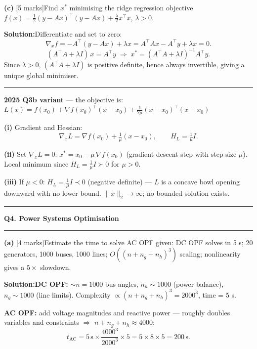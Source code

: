 \documentclass[10pt,a4paper]{article}
\newcommand{\sectitle}[1]{%
  \vspace{8pt}\noindent\rule{\linewidth}{0.8pt}\par\vspace{2pt}%
  {\large\textbf{#1}}\par\vspace{2pt}\rule{\linewidth}{0.4pt}\vspace{4pt}}
\newcommand{\Sol}{\par\vspace{4pt}\noindent\textbf{Solution:}\enspace}
\begin{document}
\vspace{4pt}
\noindent\textbf{(c)} [5 marks]\quad Find $x^*$ minimising the ridge regression
objective $f(x)=\tfrac{1}{2}(y-Ax)^\top(y-Ax)+\tfrac{\lambda}{2}x^\top x$,
$\lambda>0$.

\Sol Differentiate and set to zero:
\[
  \nabla_x f = -A^\top(y-Ax) + \lambda x = A^\top Ax - A^\top y + \lambda x = 0.
\]
\[
  (A^\top A + \lambda I)\,x = A^\top y
  \;\Rightarrow\;
  \boxed{x^* = (A^\top A + \lambda I)^{-1}A^\top y.}
\]
Since $\lambda>0$, $(A^\top A+\lambda I)$ is positive definite, hence always
invertible, giving a unique global minimiser.

\vspace{6pt}
\noindent\rule{\linewidth}{0.4pt}
\vspace{2pt}

\noindent\textbf{2025 Q3b variant} --- the objective is:
$L(x) = f(x_0)+\nabla f(x_0)^\top(x-x_0)+\tfrac{1}{2\mu}(x-x_0)^\top(x-x_0)$

\textbf{(i)} Gradient and Hessian:
\[
  \nabla_x L = \nabla f(x_0) + \tfrac{1}{\mu}(x-x_0),
  \qquad
  H_L = \tfrac{1}{\mu}I.
\]

\textbf{(ii)} Set $\nabla_x L=0$:\;
$x^* = x_0 - \mu\,\nabla f(x_0)$ (gradient descent step with step size $\mu$).
Local minimum since $H_L = \tfrac{1}{\mu}I \succ 0$ for $\mu>0$.

\textbf{(iii)} If $\mu<0$: $H_L = \tfrac{1}{\mu}I \prec 0$ (negative definite)
--- $L$ is a concave bowl opening downward with no lower bound.
$\|x\|_2\to\infty$; no bounded solution exists.

\sectitle{Q4. Power Systems Optimisation}

\noindent\textbf{(a)} [4 marks]\quad Estimate the time to solve AC OPF given:
DC OPF solves in 5 s; 20 generators, 1000 buses, 1000 lines;
$O((n+n_g+n_h)^3)$ scaling; nonlinearity gives a $5\times$ slowdown.

\Sol \textbf{DC OPF:} $\sim n=1000$ bus angles, $n_h\sim1000$ (power balance),
$n_g\sim1000$ (line limits). Complexity $\propto(n+n_g+n_h)^3=2000^3$, time = 5 s.

\textbf{AC OPF:} add voltage magnitudes and reactive power --- roughly doubles
variables and constraints $\Rightarrow$ $n+n_g+n_h\approx4000$:
\[
  t_{\text{AC}} = 5\,\text{s} \times \frac{4000^3}{2000^3} \times 5 = 5\times8\times5 = 200\,\text{s}.
\]
\end{document}
